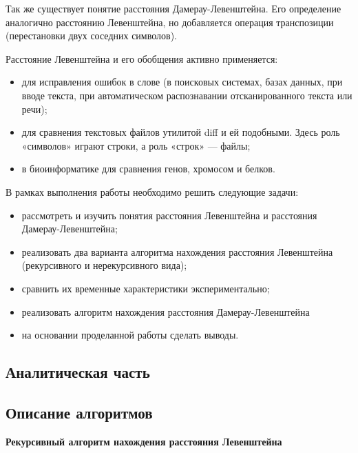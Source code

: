 \documentclass[a4paper,12pt]{article}
\begin{document}
Так же существует понятие расстояния Дамерау-Левенштейна. Его определение аналогично расстоянию Левенштейна, но добавляется операция транспозиции (перестановки двух соседних символов).

Расстояние Левенштейна и его обобщения активно применяется:
		\begin{itemize}
		    \item для исправления ошибок в слове\cite{litlink3} (в поисковых системах, базах данных, при вводе текста, при автоматическом распознавании отсканированного текста или речи);
		    \item для сравнения текстовых файлов утилитой diff и ей подобными. Здесь роль «символов» играют строки, а роль «строк» — файлы\cite{litlink2};
		    \item     в биоинформатике для сравнения генов, хромосом и белков\cite{litlink4}.
		\end{itemize}  
		
В рамках выполнения работы необходимо решить следующие задачи:   
		\begin{itemize}
		    \item рассмотреть и изучить понятия расстояния Левенштейна и расстояния 
Дамерау-Левенштейна;
			\item реализовать два варианта алгоритма нахождения расстояния Левенштейна (рекурсивного и нерекурсивного вида); 				\item сравнить их временные характеристики экспериментально; 
			\item реализовать алгоритм нахождения расстояния Дамерау-Левенштейна 
			\item на основании проделанной работы сделать выводы.
		\end{itemize}
    \newpage

    \begin{center}
        \section{Аналитическая часть}
	        \subsection{Описание алгоритмов}
    \end{center}
\textbf{Рекурсивный алгоритм нахождения расстояния Левенштейна}\\
\end{document}
